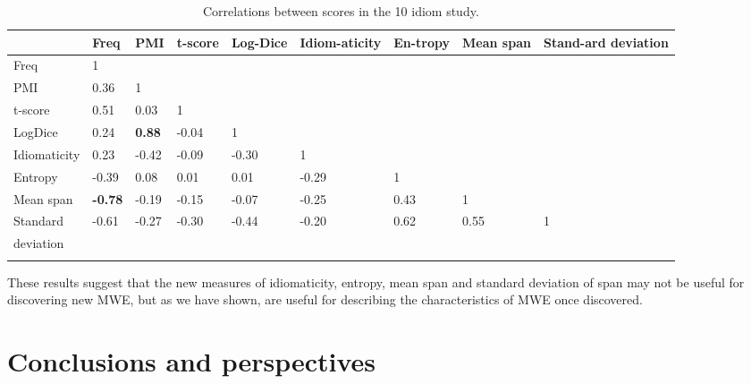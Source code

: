 \documentclass[output=paper]{langsci/langscibook}
\begin{document}
\begin{table}[ht]
\small
\begin{tabular}{p{1.8cm}p{0.85cm}p{0.85cm}p{0.85cm}p{0.85cm}p{0.85cm}p{0.8cm}p{0.85cm}p{0.85cm}}
\lsptoprule
~ & Freq & PMI & t-score & Log-Dice & Idiom-aticity & En-tropy & Mean span & Stand-ard deviation\\
\midrule
Freq &
1 &
~
 &
~
 &
~
 &
~
 &
~
 &
~
 &
~
\\
PMI &
0.36 &
1 &
~
 &
~
 &
~
 &
~
 &
~
 &
~
\\
t-score &
0.51 &
0.03 &
1 &
~
 &
~
 &
~
 &
~
 &
~
\\
LogDice &
0.24 &
\textbf{0.88} &
-0.04 &
1 &
~
 &
~
 &
~
 &
~
\\
Idiomaticity &
0.23 &
-0.42 &
-0.09 &
-0.30 &
1 &
~
 &
~
 &
~
\\
Entropy &
-0.39 &
0.08 &
0.01 &
0.01 &
-0.29 &
1 &
~
 &
~
\\
Mean span &
\textbf{-0.78} &
-0.19 &
-0.15 &
-0.07 &
-0.25 &
0.43 &
1 &
~
\\
Standard  &
-0.61 &
-0.27 &
-0.30 &
-0.44 &
-0.20 &
0.62 &
0.55 &
1\\
deviation & & & & & & & & \\
\lspbottomrule
\end{tabular}
\caption{Correlations between scores in the 10 idiom study.}
\label{correlations}
\end{table}




These results suggest that the new measures of idiomaticity, entropy,
mean span and standard deviation of span may not be useful for
discovering new MWE, but as we have shown, are useful for describing
the characteristics of MWE once discovered. 



\section{Conclusions and perspectives}
\end{document}
